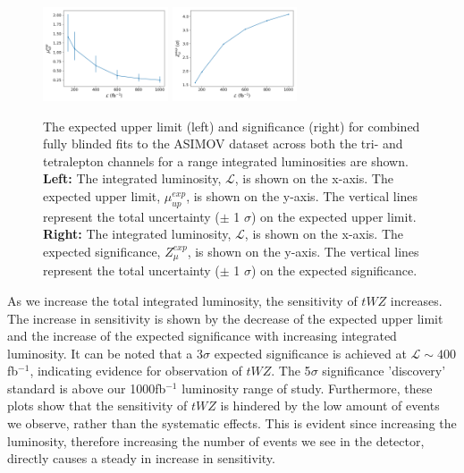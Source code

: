\begin{figure}
    \centering
    \includegraphics[width=0.33\textwidth]{figures/combined/exp_upper.png}
    \includegraphics[width=0.33\textwidth]{figures/combined/signif.png}
    \caption{The expected upper limit (left) and significance (right) for combined fully blinded fits to the ASIMOV dataset across both the tri- and tetralepton channels for a range integrated luminosities are shown. \textbf{Left: }The integrated luminosity, $\mathcal{L}$, is shown on the x-axis. The expected upper limit, $\mu_{up}^{exp}$, is shown on the y-axis. The vertical lines represent the total uncertainty ($\pm$ 1 $\sigma$) on the expected upper limit. \textbf{Right: }The integrated luminosity, $\mathcal{L}$, is shown on the x-axis. The expected significance, $Z_{\mu}^{exp}$, is shown on the y-axis. The vertical lines represent the total uncertainty ($\pm$ 1 $\sigma$) on the expected significance.}
    \label{fig:limit-sig-projection}
\end{figure}

As we increase the total integrated luminosity, the sensitivity of $tWZ$ increases. The increase in sensitivity is shown by the decrease of the expected upper limit and the increase of the expected significance with increasing integrated luminosity. It can be noted that a 3$\sigma$ expected significance is achieved at $\mathcal{L} \sim 400$fb$^{-1}$, indicating evidence for observation of $tWZ$. The 5$\sigma$ significance 'discovery' standard is above our 1000fb$^{-1}$ luminosity range of study. Furthermore, these plots show that the sensitivity of $tWZ$ is hindered by the low amount of events we observe, rather than the systematic effects. This is evident since increasing the luminosity, therefore increasing the number of events we see in the detector, directly causes a steady in increase in sensitivity.


